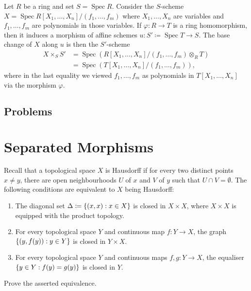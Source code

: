 \documentclass[12pt]{book}
\theoremstyle{definition}
\DeclarePairedDelimiter{\Set}{\lbrace}{\rbrace}
\DeclareMathOperator{\Spec}{Spec}
\begin{document}
	\begin{example}
		Let $R$ be a ring and set $S = \Spec R$. Consider the $S$-scheme $X = \Spec R[X_1, \dotsc, X_n]/(f_1, \dotsc, f_m)$ where $X_1, \dotsc, X_n$ are variables and $f_1, \dotsc, f_m$ are polynomials in those variables. If $\varphi \colon R \to T$ is a ring homomorphism, then it induces a morphism of affine schemes $u \colon S' \coloneqq \Spec T \to S$. The base change of $X$ along $u$ is then the $S'$-scheme
		\begin{align*}
			X \times_{S} S' & = \Spec \left(R[X_1, \dotsc, X_n]/(f_1, \dotsc, f_m) \otimes_R T\right) \\
			& = \Spec(T[X_1, \dotsc, X_n]/(f_1, \dotsc, f_m)),
		\end{align*}
		where in the last equality we viewed $f_1,\dotsc, f_m$ as polynomials in $T[X_1, \dotsc, X_n]$ via the morphism $\varphi$.
	\end{example}
	
	\section{Problems}

	\chapter{Separated Morphisms}
	
	Recall that a topological space $X$ is Hausdorff if for every two distinct points $x \neq y$, there are open neighbourhoods $U$ of $x$ and $V$ of $y$ such that $U \cap V = \emptyset$. The following conditions are equivalent to $X$ being Hausdorff:
	\begin{enumerate}
		\item The diagonal set $\Delta \coloneqq \Set{(x, x) : x \in X}$ is closed  in $X \times X$, where $X \times X$ is equipped with the product topology.
		
		\item For every topological space $Y$ and continuous map $f \colon Y \to X$, the graph $\Set{(y, f(y)) : y \in Y}$ is closed in $Y \times X$.
		
		\item For every topological space $Y$ and continuous maps $f, g\colon Y \to X$, the equaliser $\Set{y \in Y : f(y) = g(y)}$ is closed in $Y$.
	\end{enumerate}
	\begin{exercise}
		Prove the asserted equivalence.
	\end{exercise}
	
\end{document}
